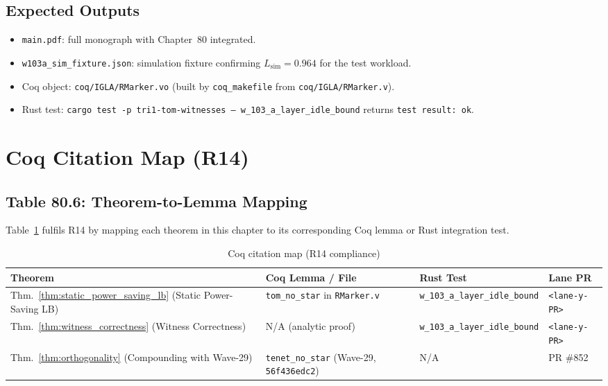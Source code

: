 \subsection{Expected Outputs}

\begin{itemize}
  \item \texttt{main.pdf}: full monograph with Chapter~80 integrated.
  \item \texttt{w103a\_sim\_fixture.json}: simulation fixture confirming
    \(L_{\mathrm{sim}} = 0.964\) for the test workload.
  \item Coq object: \texttt{coq/IGLA/RMarker.vo} (built by
    \texttt{coq\_makefile} from \texttt{coq/IGLA/RMarker.v}).
  \item Rust test: \texttt{cargo test -p tri1-tom-witnesses --
    w\_103\_a\_layer\_idle\_bound} returns \texttt{test result: ok}.
\end{itemize}

\section{Coq Citation Map (R14)}
\label{sec:coq_citation_map}

\subsection{Table 80.6: Theorem-to-Lemma Mapping}

Table~\ref{tab:coq_citation_map} fulfils R14 by mapping each theorem in
this chapter to its corresponding Coq lemma or Rust integration test.

\begin{table}[ht]
\centering
\caption{Coq citation map (R14 compliance)}
\label{tab:coq_citation_map}
\begin{tabular}{p{3.5cm}p{3cm}p{3cm}p{3cm}}
\hline
Theorem & Coq Lemma / File & Rust Test & Lane PR \\
\hline
Thm.~\ref{thm:static_power_saving_lb} (Static Power-Saving LB) &
  \texttt{tom\_no\_star} in \newline \texttt{RMarker.v} &
  \texttt{w\_103\_a\_layer\_idle\_bound} &
  \texttt{<lane-y-PR>} \\
Thm.~\ref{thm:witness_correctness} (Witness Correctness) &
  N/A (analytic proof) &
  \texttt{w\_103\_a\_layer\_idle\_bound} &
  \texttt{<lane-y-PR>} \\
Thm.~\ref{thm:orthogonality} (Compounding with Wave-29) &
  \texttt{tenet\_no\_star} \newline (Wave-29, \texttt{56f436edc2}) &
  N/A &
  PR \#852 \\
\hline
\end{tabular}
\end{table}

